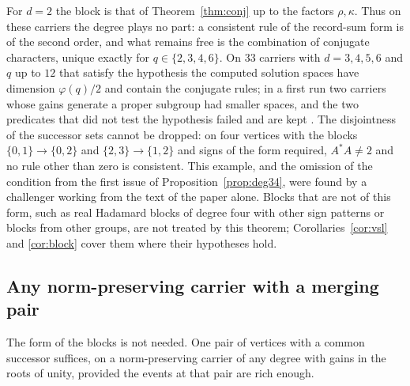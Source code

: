 For $d=2$ the block is that of Theorem~\ref{thm:conj} up to the factors $\rho,\kappa$. Thus on these carriers the degree plays no part: a consistent rule of the record-sum form is of the second order, and what remains free is the combination of conjugate characters, unique exactly for $q\in\{2,3,4,6\}$. On $33$ carriers with $d=3,4,5,6$ and $q$ up to $12$ that satisfy the hypothesis the computed solution spaces have dimension $\varphi(q)/2$ and contain the conjugate rules; in a first run two carriers whose gains generate a proper subgroup had smaller spaces, and the two predicates that did not test the hypothesis failed and are kept \cite{comp4s}. The disjointness of the successor sets cannot be dropped: on four vertices with the blocks $\{0,1\}\to\{0,2\}$ and $\{2,3\}\to\{1,2\}$ and signs of the form required, $A^*A\ne2$ and no rule other than zero is consistent. This example, and the omission of the condition from the first issue of Proposition~\ref{prop:deg34}, were found by a challenger working from the text of the paper alone. Blocks that are not of this form, such as real Hadamard blocks of degree four with other sign patterns or blocks from other groups, are not treated by this theorem; Corollaries~\ref{cor:vsl} and \ref{cor:block} cover them where their hypotheses hold.

\subsection{Any norm-preserving carrier with a merging pair}
The form of the blocks is not needed. One pair of vertices with a common successor suffices, on a norm-preserving carrier of any degree with gains in the roots of unity, provided the events at that pair are rich enough.

